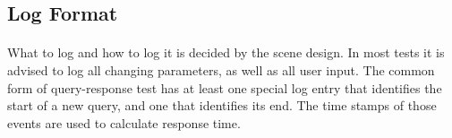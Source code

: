 \subsection{Log Format}
\paragraph{}
What to log and how to log it is decided by the scene design.
In most tests it is advised to log all changing parameters, as well as all user input.
The common form of query-response test has at least one special log entry that identifies the start of a new query, and one that identifies its end.
The time stamps of those events are used to calculate response time.


